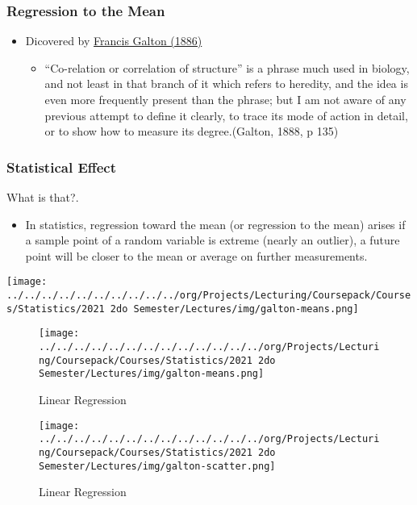 \documentclass[10pt,article]{article}
\begin{document}
\subsubsection{Regression to the Mean}
\label{sec:orgdc84e03}
\begin{itemize}
\item Dicovered by \href{https://en.wikipedia.org/wiki/Francis\_Galton}{Francis Galton (1886)}
\begin{itemize}
\item “Co-relation or correlation of structure” is a phrase much used in biology, and not least in that branch of it which refers to heredity, and the idea is even more frequently present than the phrase; but I am not aware of any previous attempt to define it clearly, to trace its mode of action in detail, or to show how to measure its degree.(Galton, 1888, p 135)
\end{itemize}
\end{itemize}
\subsubsection{Statistical Effect}
\label{sec:org5723815}
What is that?.
\begin{itemize}
\item In statistics, regression toward the mean (or regression to the mean) arises if a sample point of a random variable is extreme (nearly an outlier), a future point will be closer to the mean or average on further measurements.
\end{itemize}

\begin{center}
\texttt{[image: ../../../../../../../../../../org/Projects/Lecturing/Coursepack/Courses/Statistics/2021 2do Semester/Lectures/img/galton-means.png]}
\end{center}

\begin{figure}[htbp]
\centering
\texttt{[image: ../../../../../../../../../../../../../org/Projects/Lecturing/Coursepack/Courses/Statistics/2021 2do Semester/Lectures/img/galton-means.png]}
\caption{\label{fig:multivariate}Linear Regression}
\end{figure}

\begin{figure}[htbp]
\centering
\texttt{[image: ../../../../../../../../../../../../../org/Projects/Lecturing/Coursepack/Courses/Statistics/2021 2do Semester/Lectures/img/galton-scatter.png]}
\caption{\label{fig:multivariate}Linear Regression}
\end{figure}
\end{document}
